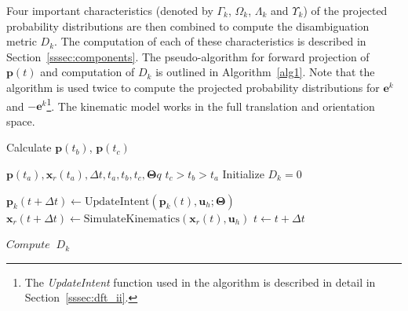 Four important characteristics (denoted by $\Gamma_k$, $\Omega_k$, $\Lambda_k$ and $\Upsilon_k$) of the projected probability distributions are then combined to compute the disambiguation metric $D_k$. The computation of each of these characteristics is described in Section~\ref{sssec:components}. The pseudo-algorithm for forward projection of $\boldsymbol{p}(t)$ and computation of $D_k$ is outlined in Algorithm~\ref{alg1}. Note that the algorithm is used twice to compute the projected probability distributions for $\boldsymbol{e}^k$ and $-\boldsymbol{e}^k$\footnote{The \textit{UpdateIntent} function used in the algorithm is described in detail in Section~\ref{sssec:dft_ii}.}. The kinematic model works in the full translation and orientation space. 
\begin{algorithm}
	\caption{Calculate $\boldsymbol{p}(t_b)$, $\boldsymbol{p}(t_c)$}
	\label{alg1}
	\begin{algorithmic}
		\REQUIRE $\boldsymbol{p}(t_a), \boldsymbol{x}_r(t_a), \Delta t, t_a, t_b, t_c, \boldsymbol{\Theta}q$
		\ENSURE $t_c > t_b > t_a$
		\STATE Initialize $D_k = 0$
		
			\STATE $\boldsymbol{p}_k(t + \Delta t) \leftarrow \text{UpdateIntent}(\boldsymbol{p}_k(t), \boldsymbol{u}_h; \boldsymbol{\Theta})$
			\STATE $\boldsymbol{x}_r(t + \Delta t) \leftarrow \text{SimulateKinematics}(\boldsymbol{x}_r(t), \boldsymbol{u}_h)$
			  
			\ENDIF
			  \ENDIF
			\STATE $t \leftarrow t + \Delta t$
		\ENDFOR
	
%		
		
		\STATE $Compute \;\;D_k$
		\ENDFOR
		
	\end{algorithmic}
\end{algorithm}

